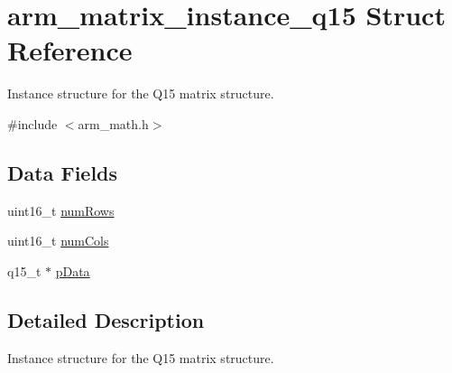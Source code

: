 \hypertarget{structarm__matrix__instance__q15}{\section{arm\-\_\-matrix\-\_\-instance\-\_\-q15 Struct Reference}
\label{structarm__matrix__instance__q15}
}


Instance structure for the Q15 matrix structure.  




{\ttfamily \#include $<$arm\-\_\-math.\-h$>$}

\subsection*{Data Fields}
\begin{DoxyCompactItemize}
\item 
uint16\-\_\-t \hyperlink{structarm__matrix__instance__q15_a1bcf80ccdc2acc29198f1592ae300390}{num\-Rows}
\item 
uint16\-\_\-t \hyperlink{structarm__matrix__instance__q15_a4bb5ec0d13eb4c9cf887aa8366a44117}{num\-Cols}
\item 
q15\-\_\-t $\ast$ \hyperlink{structarm__matrix__instance__q15_a817ede38365e63e561a12069c6c5c087}{p\-Data}
\end{DoxyCompactItemize}


\subsection{Detailed Description}
Instance structure for the Q15 matrix structure. 


